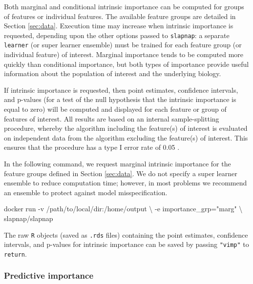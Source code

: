 \documentclass[
]{article}
\newenvironment{Shaded}{\begin{snugshade}}{\end{snugshade}}
\newcommand{\ExtensionTok}[1]{#1}
\newcommand{\NormalTok}[1]{#1}
\newcommand{\StringTok}[1]{\textcolor[rgb]{0.31,0.60,0.02}{#1}}
\begin{document}
Both marginal and conditional intrinsic importance can be computed for groups of features or individual features. The available feature groups are detailed in Section \ref{sec:data}. Execution time may increase when intrinsic importance is requested, depending upon the other options passed to \texttt{slapnap}: a separate \texttt{learner} (or super learner ensemble) must be trained for each feature group (or individual feature) of interest. Marginal importance tends to be computed more quickly than conditional importance, but both types of importance provide useful information about the population of interest and the underlying biology.

If intrinsic importance is requested, then point estimates, confidence intervals, and p-values (for a test of the null hypothesis that the intrinsic importance is equal to zero) will be computed and displayed for each feature or group of features of interest. All results are based on an internal sample-splitting procedure, whereby the algorithm including the feature(s) of interest is evaluated on independent data from the algorithm excluding the feature(s) of interest. This ensures that the procedure has a type I error rate of 0.05 \citep{williamson2020}.

In the following command, we request marginal intrinsic importance for the feature groups defined in Section \ref{sec:data}. We do not specify a super learner ensemble to reduce computation time; however, in most problems we recommend an ensemble to protect against model misspecification.

\begin{Shaded}
\begin{Highlighting}[]
\ExtensionTok{docker}\NormalTok{ run {-}v /path/to/local/dir:/home/output \textbackslash{}}
\NormalTok{           {-}e importance\_grp=}\StringTok{"marg"}\NormalTok{ \textbackslash{}}
\NormalTok{           slapnap/slapnap}
\end{Highlighting}
\end{Shaded}

The raw \texttt{R} objects (saved as \texttt{.rds} files) containing the point estimates, confidence intervals, and p-values for intrinsic importance can be saved by passing \texttt{"vimp"} to \texttt{return}.

\hypertarget{sec:predimp}{%
\subsubsection{Predictive importance}\label{sec:predimp}}
\end{document}
